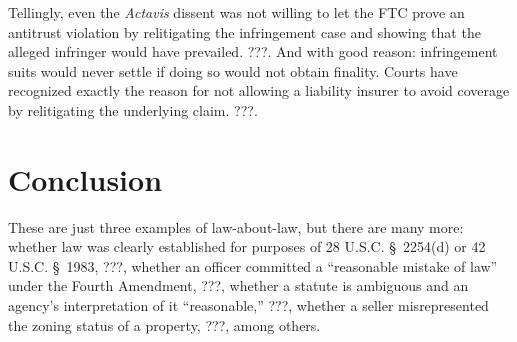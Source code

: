 \documentclass[
  12pt,
  letterpaper,
]{scrartcl}
\begin{document}
Tellingly, even the \textit{Actavis} dissent was not willing to let the FTC
prove an antitrust violation by relitigating the infringement case and showing
that the alleged infringer would have prevailed. ???. And with good reason:
infringement suits would never settle if doing so would not obtain finality.
Courts have recognized exactly the reason for not allowing a liability insurer
to avoid coverage by relitigating the underlying claim. ???.


\section{Conclusion}

These are just three examples of law-about-law, but there are many more:
whether law was clearly established for purposes of 28 U.S.C. § 2254(d) or 42
U.S.C. § 1983, ???, whether an officer committed a ``reasonable mistake of
law'' under the Fourth Amendment, ???, whether a statute is ambiguous and an
agency's interpretation of it ``reasonable,'' ???, whether a seller
misrepresented the zoning status of a property, ???, among others.
\end{document}

